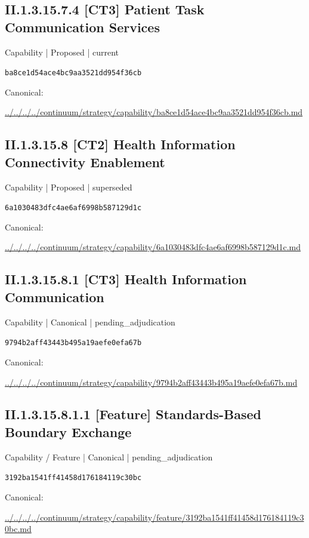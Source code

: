 \documentclass[10pt,a4paper]{article}
\begin{document}
\subsection*{II.1.3.15.7.4 [CT3] Patient Task Communication Services}
{\small Capability | Proposed | current}\par
\texttt{ba8ce1d54ace4bc9aa3521dd954f36cb}\par
Canonical: \par
{\footnotesize\url{../../../../continuum/strategy/capability/ba8ce1d54ace4bc9aa3521dd954f36cb.md}}\par
\subsection*{II.1.3.15.8 [CT2] Health Information Connectivity Enablement}
{\small Capability | Proposed | superseded}\par
\texttt{6a1030483dfc4ae6af6998b587129d1c}\par
Canonical: \par
{\footnotesize\url{../../../../continuum/strategy/capability/6a1030483dfc4ae6af6998b587129d1c.md}}\par
\subsection*{II.1.3.15.8.1 [CT3] Health Information Communication}
{\small Capability | Canonical | pending\_adjudication}\par
\texttt{9794b2aff43443b495a19aefe0efa67b}\par
Canonical: \par
{\footnotesize\url{../../../../continuum/strategy/capability/9794b2aff43443b495a19aefe0efa67b.md}}\par
\subsection*{II.1.3.15.8.1.1 [Feature] Standards-Based Boundary Exchange}
{\small Capability / Feature | Canonical | pending\_adjudication}\par
\texttt{3192ba1541ff41458d176184119c30bc}\par
Canonical: \par
{\footnotesize\url{../../../../continuum/strategy/capability/feature/3192ba1541ff41458d176184119c30bc.md}}\par
\end{document}
